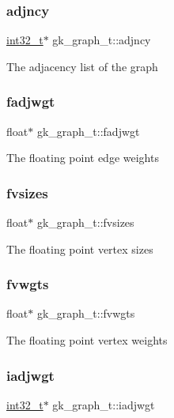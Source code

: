 \subsubsection{\texorpdfstring{adjncy}{adjncy}}
{\footnotesize\ttfamily \hyperlink{a00119_a37994e3b11c72957c6f454c6ec96d43d}{int32\+\_\+t}$\ast$ gk\+\_\+graph\+\_\+t\+::adjncy}

The adjacency list of the graph \mbox{\label{a00638_a96d4bbf3a3f9958549d53160d6f6d3aa}} 
\subsubsection{\texorpdfstring{fadjwgt}{fadjwgt}}
{\footnotesize\ttfamily float$\ast$ gk\+\_\+graph\+\_\+t\+::fadjwgt}

The floating point edge weights \mbox{\label{a00638_ab43a62e6f11f9cd20c5b6b7d3d02bb0e}} 
\subsubsection{\texorpdfstring{fvsizes}{fvsizes}}
{\footnotesize\ttfamily float$\ast$ gk\+\_\+graph\+\_\+t\+::fvsizes}

The floating point vertex sizes \mbox{\label{a00638_a900444f2ba7d2ecaf89591f85c849991}} 
\subsubsection{\texorpdfstring{fvwgts}{fvwgts}}
{\footnotesize\ttfamily float$\ast$ gk\+\_\+graph\+\_\+t\+::fvwgts}

The floating point vertex weights \mbox{\label{a00638_aa5c9adf88207adf2bd0cc100042f335b}} 
\subsubsection{\texorpdfstring{iadjwgt}{iadjwgt}}
{\footnotesize\ttfamily \hyperlink{a00119_a37994e3b11c72957c6f454c6ec96d43d}{int32\+\_\+t}$\ast$ gk\+\_\+graph\+\_\+t\+::iadjwgt}


